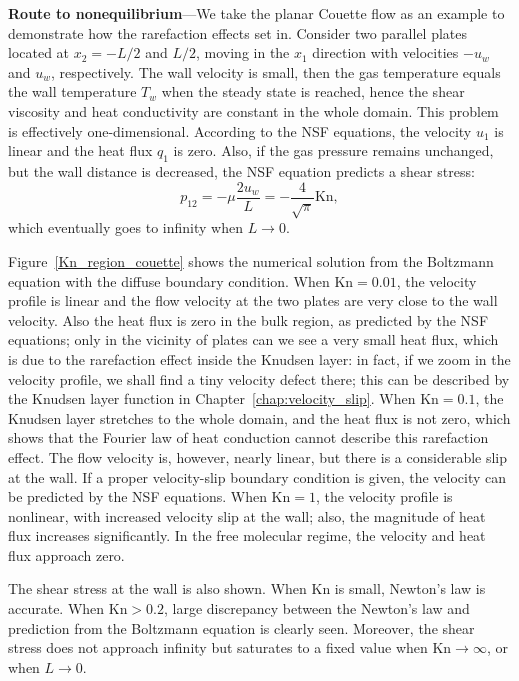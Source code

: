 \textbf{Route to nonequilibrium}---We take the planar Couette flow  as an example to demonstrate how the rarefaction effects set in. Consider two parallel plates located  at $x_2=-L/2$ and $L/2$, moving in the $x_1$ direction with velocities $-u_w$ and $u_w$, respectively. The wall velocity is small, then the gas temperature  equals the wall temperature $T_w$ when the steady state is reached, hence the shear viscosity and heat conductivity are constant in the whole domain. This problem is effectively one-dimensional. According to the NSF equations, the velocity $u_1$ is linear and the heat flux $q_1$ is zero. Also, if the gas pressure remains unchanged, but the wall distance is decreased, the NSF equation predicts a shear stress: 
\begin{equation}\label{shear_stress_small_Kn}
p_{12}=-\mu\frac{2u_w}{L}=-\frac{4}{\sqrt{\pi}}\text{Kn},
\end{equation}
which eventually goes to infinity when $L\rightarrow0$. %




Figure~\ref{Kn_region_couette} shows the numerical solution from the Boltzmann equation with the diffuse boundary condition. When $\text{Kn}=0.01$, the velocity profile is linear and the flow velocity at the two plates are very close to the wall velocity. Also the heat flux is zero in the bulk region, as predicted by the NSF equations; only in the vicinity of plates can we see a very small heat flux, which is due to the rarefaction effect inside the Knudsen layer: in fact, if we zoom in the velocity profile, we shall find a tiny velocity defect there; this can be described by the Knudsen layer function  in Chapter~\ref{chap:velocity_slip}.
When $\text{Kn}=0.1$, the Knudsen layer stretches to the whole domain, and the heat flux is not zero, which shows that the Fourier law of heat conduction cannot describe this rarefaction effect. The flow velocity is, however, nearly linear, but there is a considerable slip at the wall. If a proper velocity-slip boundary condition is given, the velocity can be predicted by the NSF equations. 
When $\text{Kn}=1$, the velocity profile is nonlinear, with increased velocity slip at the wall; also, the magnitude of heat flux increases significantly. 
In the free molecular regime, the velocity and heat flux approach zero. 


The shear stress at the wall is also shown. When $\text{Kn}$ is small, Newton's law is accurate. When $\text{Kn}>0.2$, large discrepancy between the Newton's law and prediction from the Boltzmann equation is clearly seen. Moreover, the shear stress does not approach infinity but saturates to a fixed value when $\text{Kn}\rightarrow\infty$, or when $L\rightarrow0$. 

